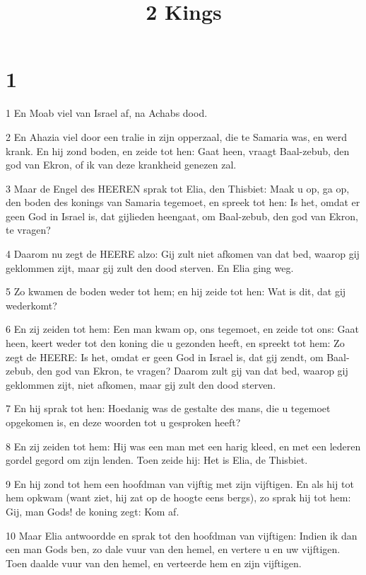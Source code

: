 

\title{2 Kings}



\chapter{1}

\par 1 En Moab viel van Israel af, na Achabs dood.
\par 2 En Ahazia viel door een tralie in zijn opperzaal, die te Samaria was, en werd krank. En hij zond boden, en zeide tot hen: Gaat heen, vraagt Baal-zebub, den god van Ekron, of ik van deze krankheid genezen zal.
\par 3 Maar de Engel des HEEREN sprak tot Elia, den Thisbiet: Maak u op, ga op, den boden des konings van Samaria tegemoet, en spreek tot hen: Is het, omdat er geen God in Israel is, dat gijlieden heengaat, om Baal-zebub, den god van Ekron, te vragen?
\par 4 Daarom nu zegt de HEERE alzo: Gij zult niet afkomen van dat bed, waarop gij geklommen zijt, maar gij zult den dood sterven. En Elia ging weg.
\par 5 Zo kwamen de boden weder tot hem; en hij zeide tot hen: Wat is dit, dat gij wederkomt?
\par 6 En zij zeiden tot hem: Een man kwam op, ons tegemoet, en zeide tot ons: Gaat heen, keert weder tot den koning die u gezonden heeft, en spreekt tot hem: Zo zegt de HEERE: Is het, omdat er geen God in Israel is, dat gij zendt, om Baal-zebub, den god van Ekron, te vragen? Daarom zult gij van dat bed, waarop gij geklommen zijt, niet afkomen, maar gij zult den dood sterven.
\par 7 En hij sprak tot hen: Hoedanig was de gestalte des mans, die u tegemoet opgekomen is, en deze woorden tot u gesproken heeft?
\par 8 En zij zeiden tot hem: Hij was een man met een harig kleed, en met een lederen gordel gegord om zijn lenden. Toen zeide hij: Het is Elia, de Thisbiet.
\par 9 En hij zond tot hem een hoofdman van vijftig met zijn vijftigen. En als hij tot hem opkwam (want ziet, hij zat op de hoogte eens bergs), zo sprak hij tot hem: Gij, man Gods! de koning zegt: Kom af.
\par 10 Maar Elia antwoordde en sprak tot den hoofdman van vijftigen: Indien ik dan een man Gods ben, zo dale vuur van den hemel, en vertere u en uw vijftigen. Toen daalde vuur van den hemel, en verteerde hem en zijn vijftigen.
